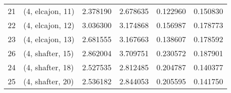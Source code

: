 \begin{tabular}{llrrrr}
21 &  (4, elcajon, 11) &   2.378190 &   2.678635 &   0.122960 &  0.150830 \\
22 &  (4, elcajon, 12) &   3.036300 &   3.174868 &   0.156987 &  0.178773 \\
23 &  (4, elcajon, 13) &   2.681555 &   3.167663 &   0.138607 &  0.178592 \\
26 &  (4, shafter, 15) &   2.862004 &   3.709751 &   0.230572 &  0.187901 \\
24 &  (4, shafter, 18) &   2.527535 &   2.812485 &   0.204787 &  0.140377 \\
25 &  (4, shafter, 20) &   2.536182 &   2.844053 &   0.205595 &  0.141750 \\
\bottomrule
\end{tabular}
